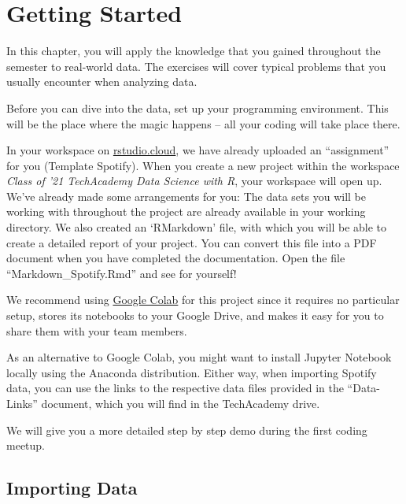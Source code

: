 \documentclass[
  11pt,
]{book}
\newenvironment{tips}[1]
  {
  \begin{itemize}
  \footnotesize
  \renewcommand{\labelitemi}{
    \raisebox{-.7\height}[0pt][0pt]{
      {\setkeys{Gin}{width=3em,keepaspectratio}
        \texttt{[image: images/\#1.png]}}
    }
  }
  \setlength{\fboxsep}{1em}
  \begin{rbox}
  \item
  }
  {
  \end{rbox}
  \end{itemize}
  }
\newenvironment{tipsp}[1]
  {
  \begin{itemize}
  \footnotesize
  \renewcommand{\labelitemi}{
    \raisebox{-.7\height}[0pt][0pt]{
      {\setkeys{Gin}{width=3em,keepaspectratio}
        \texttt{[image: images/\#1.png]}}
    }
  }
  \setlength{\fboxsep}{1em}
  \begin{pbox}
  \item
  }
  {
  \end{pbox}
  \end{itemize}
  }
\begin{document}
\hypertarget{getting-started}{%
\section{Getting Started}\label{getting-started}}

In this chapter, you will apply the knowledge that you gained throughout the semester to real-world data. The exercises will cover typical problems that you usually encounter when analyzing data.

Before you can dive into the data, set up your programming environment. This will be the place where the magic happens -- all your coding will take place there.

\begin{tips}r

In your workspace on \href{https://rstudio.cloud/projects}{rstudio.cloud}, we have already uploaded an ``assignment'' for you (Template Spotify). When you create a new project within the workspace \emph{Class of '21 \textbar{} TechAcademy \textbar{} Data Science with R}, your workspace will open up. We've already made some arrangements for you: The data sets you will be working with throughout the project are already available in your working directory. We also created an `RMarkdown' file, with which you will be able to create a detailed report of your project. You can convert this file into a PDF document when you have completed the documentation. Open the file ``Markdown\_Spotify.Rmd'' and see for yourself!

\end{tips}

\begin{tipsp}p

We recommend using \href{https://colab.research.google.com}{Google Colab} for this project since it requires no particular setup, stores its notebooks to your Google Drive, and makes it easy for you to share them with your team members.

As an alternative to Google Colab, you might want to install Jupyter Notebook locally using the Anaconda distribution.
Either way, when importing Spotify data, you can use the links to the respective data files provided in the ``Data-Links'' document, which you will find in the TechAcademy drive.

We will give you a more detailed step by step demo during the first coding meetup.

\end{tipsp}

\hypertarget{importing-data}{%
\subsection{Importing Data}\label{importing-data}}
\end{document}
